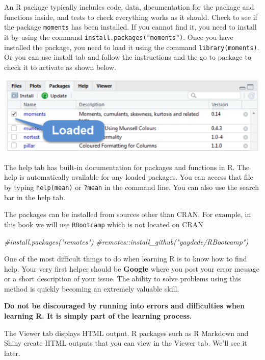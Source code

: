 \documentclass[
]{book}
\newenvironment{Shaded}{\begin{snugshade}}{\end{snugshade}}
\newcommand{\CommentTok}[1]{\textcolor[rgb]{0.56,0.35,0.01}{\textit{#1}}}
\theoremstyle{definition}
\theoremstyle{definition}
\theoremstyle{definition}
\theoremstyle{definition}
\theoremstyle{remark}
\begin{document}
An R package typically includes code, data, documentation for the package and functions inside, and tests to check everything works as it should. Check to see if the package \texttt{moments} has been installed. If you cannot find it, you need to install it by using the command \texttt{install.packages("moments")}. Once you have installed the package, you need to load it using the command \texttt{library(moments)}. Or you can use install tab and follow the instructions and the go to package to check it to activate as shown below.

\includegraphics[width=8.12in]{png/Rstudio4}

The help tab has built-in documentation for packages and functions in R. The help is automatically available for any loaded packages. You can access that file by typing \texttt{help(mean)} or \texttt{?mean} in the command line. You can also use the search bar in the help tab.

The packages can be installed from sources other than CRAN. For example, in this book we will use \texttt{RBootcamp} which is not located on CRAN

\begin{Shaded}
\begin{Highlighting}[]
\CommentTok{\#install.packages("remotes")}
\CommentTok{\#remotes::install\_github("yaydede/RBootcamp")}
\end{Highlighting}
\end{Shaded}

One of the most difficult things to do when learning R is to know how to find help. Your very first helper should be \textbf{Google} where you post your error message or a short description of your issue. The ability to solve problems using this method is quickly becoming an extremely valuable skill.

\textbf{Do not be discouraged by running into errors and difficulties when learning R. It is simply part of the learning process.}

The Viewer tab displays HTML output. R packages such as R Markdown and Shiny create HTML outputs that you can view in the Viewer tab. We'll see it later.
\end{document}
